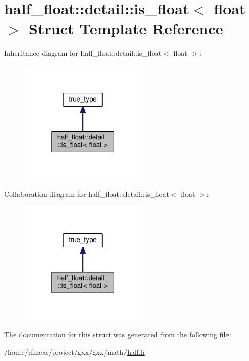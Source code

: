 \hypertarget{structhalf__float_1_1detail_1_1is__float_3_01float_01_4}{}\section{half\+\_\+float\+:\+:detail\+:\+:is\+\_\+float$<$ float $>$ Struct Template Reference}
\label{structhalf__float_1_1detail_1_1is__float_3_01float_01_4}


Inheritance diagram for half\+\_\+float\+:\+:detail\+:\+:is\+\_\+float$<$ float $>$\+:
\nopagebreak
\begin{figure}[H]
\begin{center}
\leavevmode
\includegraphics[width=171pt]{structhalf__float_1_1detail_1_1is__float_3_01float_01_4__inherit__graph}
\end{center}
\end{figure}


Collaboration diagram for half\+\_\+float\+:\+:detail\+:\+:is\+\_\+float$<$ float $>$\+:
\nopagebreak
\begin{figure}[H]
\begin{center}
\leavevmode
\includegraphics[width=171pt]{structhalf__float_1_1detail_1_1is__float_3_01float_01_4__coll__graph}
\end{center}
\end{figure}


The documentation for this struct was generated from the following file\+:\begin{DoxyCompactItemize}
\item 
/home/rfmeas/project/gxx/gxx/math/\hyperlink{half_8h}{half.\+h}\end{DoxyCompactItemize}
